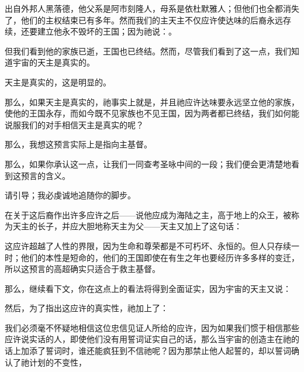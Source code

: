 出自外邦人黑落德，他父系是阿市刻隆人，母系是依杜默雅人；但他们也全都消失了，他们的主权结束已有多年。然而我们的主天主不仅应许使达味的后裔永远存续，还要建立他永不毁坏的王国；因为祂说：。\par

但我们看到他的家族已逝，王国也已终结。然而，尽管我们看到了这一点，我们知道宇宙的天主是真实的。\par

天主是真实的，这是明显的。\par

那么，如果天主是真实的，祂事实上就是，并且祂应许达味要永远坚立他的家族，使他的王国永存，而如今既不见家族也不见王国，因为两者都已终结，我们如何能说服我们的对手相信天主是真实的呢？\par

那么，我想这预言实际上是指向主基督。\par

那么，如果你承认这一点，让我们一同查考圣咏中间的一段；我们便会更清楚地看到这预言的含义。\par

请引导；我必虔诚地追随你的脚步。\par

在关于这后裔作出许多应许之后——说他应成为海陆之主，高于地上的众王，被称为天主的长子，并应大胆地称天主为父——天主又加上了这句话：\par

这应许超越了人性的界限，因为生命和尊荣都是不可朽坏、永恒的。但人只存续一时；他们的本性是短命的，他们的王国即使在有生之年也要经历许多多样的变迁，所以这预言的高超确实只适合于救主基督。\par

那么，继续看下文，你在这点上的看法将得到全面证实，因为宇宙的天主又说：\par

然后，为了指出这应许的真实性，祂加上了：\par

我们必须毫不怀疑地相信这位忠信见证人所给的应许，因为如果我们惯于相信那些应许说实话的人，即使他们没有用誓词证实自己的话，那么当宇宙的创造主在祂的话上加添了誓词时，谁还能疯狂到不信祂呢？因为那禁止他人起誓的，却以誓词确认了祂计划的不变性，\par

